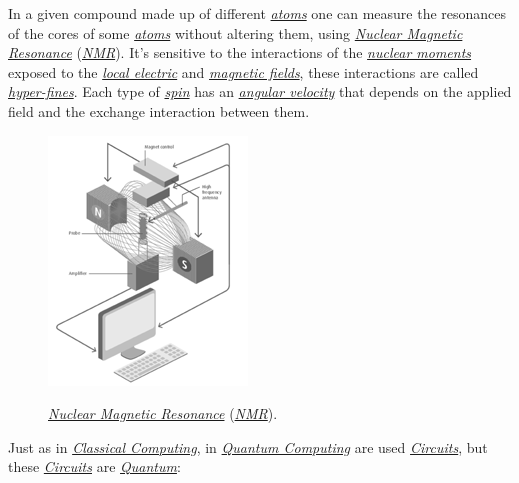 \documentclass[conference]{IEEEtran}
\begin{document}
\vspace{4pt}

In a given compound made up of different \href{https://en.wikipedia.org/wiki/Atom}{\textit{atoms}} one can measure the resonances of the cores of some \href{https://en.wikipedia.org/wiki/Atom}{\textit{atoms}} without altering them, using \href{https://en.wikipedia.org/wiki/Nuclear_magnetic_resonance}{\textit{Nuclear Magnetic Resonance}} (\href{https://en.wikipedia.org/wiki/Nuclear_magnetic_resonance}{\textit{NMR}}). It's sensitive to the interactions of the \href{https://en.wikipedia.org/wiki/Nuclear_magnetic_moment}{\textit{nuclear moments}} exposed to the \href{https://en.wikipedia.org/wiki/Electric_field}{\textit{local electric}} and \href{https://en.wikipedia.org/wiki/Magnetic_field}{\textit{magnetic fields}}, these interactions are called \href{https://en.wikipedia.org/wiki/Hyperfine_structure}{\textit{hyper-fines}}. Each type of \href{https://en.wikipedia.org/wiki/Spin_states_(d_electrons)}{\textit{spin}} has an \href{https://en.wikipedia.org/wiki/Angular_velocity}{\textit{angular velocity}} that depends on the applied field and the exchange interaction between them.

\vspace{6pt}

\begin{figure}[htbp]
\centerline{\href{https://en.wikipedia.org/wiki/Nuclear_magnetic_resonance}{\includegraphics{imgs/fig-5.png}}}
\caption{\href{https://en.wikipedia.org/wiki/Nuclear_magnetic_resonance}{\textit{Nuclear Magnetic Resonance}} (\href{https://en.wikipedia.org/wiki/Nuclear_magnetic_resonance}{\textit{NMR}}).}
\label{fig}
\end{figure}

\newpage

Just as in \href{https://en.wikipedia.org/wiki/Von_Neumann_architecture}{\textit{Classical Computing}}, in \href{https://en.wikipedia.org/wiki/Quantum_computing}{\textit{Quantum Computing}} are used \href{https://en.wikipedia.org/wiki/Circuit}{\textit{Circuits}}, but these \href{https://en.wikipedia.org/wiki/Circuit}{\textit{Circuits}} are \href{https://en.wikipedia.org/wiki/Quantum}{\textit{Quantum}}:
\end{document}
